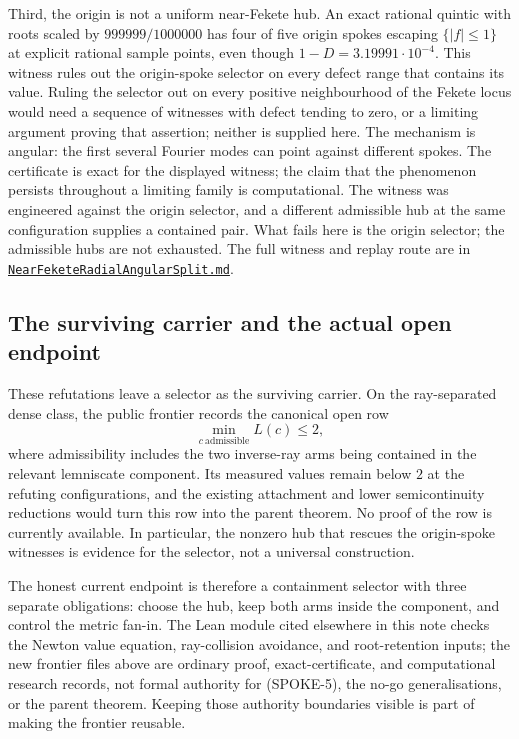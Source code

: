 Third, the origin is not a uniform near-Fekete hub.  An exact rational
quintic with roots scaled by $999999/1000000$ has four of five origin spokes
escaping $\{|f|\le1\}$ at explicit rational sample points, even though
$1-D=3.19991\cdot10^{-4}$.  This witness rules out the origin-spoke selector
on every defect range that contains its value.  Ruling the selector out on
every positive neighbourhood of the Fekete locus would need a sequence of
witnesses with defect tending to zero, or a limiting argument proving that
assertion; neither is supplied here.  The mechanism is angular: the first
several Fourier modes can point against different spokes.  The certificate is
exact for the displayed witness; the claim that the phenomenon persists
throughout a limiting family is computational.  The witness was engineered
against the origin selector, and a different admissible hub at the same
configuration supplies a contained pair.  What fails here is the origin
selector; the admissible hubs are not exhausted.  The full witness and replay route are in
\href{https://github.com/wcook04/plectis-erdos/blob/f214a6b45528dc5eefe20ffadc35f2e981627d4c/research_corpus/Erdos1041/NearFeketeRadialAngularSplit.md}{\texttt{NearFeketeRadialAngularSplit.md}}.

\subsection*{The surviving carrier and the actual open endpoint}

These refutations leave a selector as the surviving carrier.  On the
ray-separated dense class, the public frontier records the canonical open row
\[
  \min_{c\ \mathrm{admissible}} L(c)\le2,
\]
where admissibility includes the two inverse-ray arms being contained in the
relevant lemniscate component.  Its measured values remain below $2$ at the
refuting configurations, and the existing attachment and lower
semicontinuity reductions would turn this row into the parent theorem.  No
proof of the row is currently available.  In particular, the nonzero hub
that rescues the origin-spoke witnesses is evidence for the selector, not a
universal construction.

The honest current endpoint is therefore a containment selector with three
separate obligations: choose the hub, keep both arms inside the component,
and control the metric fan-in.  The Lean module cited elsewhere in this note
checks the Newton value equation, ray-collision avoidance, and root-retention
inputs; the new frontier files above are ordinary proof, exact-certificate,
and computational research records, not formal authority for (SPOKE-5), the
no-go generalisations, or the parent theorem.  Keeping those authority
boundaries visible is part of making the frontier reusable.

